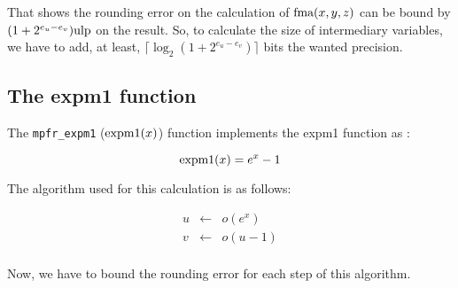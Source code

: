 \documentclass[12pt]{amsart}
\def\n{\textnormal}
\def\ulp{{\rm ulp}}
\begin{document}
That shows the rounding error on the calculation of $\n{fma}(x,y,z)$ can be
bound by $(1+2^{e_u-e_v}) \ulp$ on the result. So, to calculate the size of
intermediary variables, we have to add, at least, $\lceil \log_2 (1+2^{e_u-e_v})\rceil$ bits the wanted precision.

\subsection{The expm1 function}

The {\tt mpfr\_expm1} ($\n{expm1}(x)$) function implements the expm1 function  as :

\[
\textnormal{expm1} (x) = e^x -1
\]

The algorithm used for this calculation is as follows:

\begin{eqnarray}\nonumber
u&\leftarrow&o(e^x)\\\nonumber
v&\leftarrow&o(u-1)\\\nonumber
\end{eqnarray}

Now, we have to bound the rounding error for each step of this
algorithm.  
\end{document}
